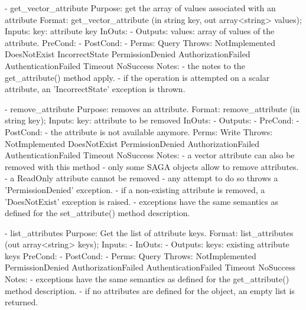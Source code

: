 \begin{myspec}
 
    - get_vector_attribute
      Purpose:  get the array of values associated with an
                attribute
      Format:   get_vector_attribute (in string           key,
                                      out array<string>   values);
      Inputs:   key:                  attribute key
      InOuts:   -
      Outputs:  values:               array of values of the
                                      attribute.
      PreCond:  -
      PostCond: -
      Perms:    Query
      Throws:   NotImplemented
                DoesNotExist
                IncorrectState
                PermissionDenied
                AuthorizationFailed
                AuthenticationFailed
                Timeout
                NoSuccess
      Notes:    - the notes to the get_attribute() method apply.
                - if the operation is attempted on a scalar
                  attribute, an 'IncorrectState' exception is
                  thrown.
 
 
    - remove_attribute
      Purpose:  removes an attribute.
      Format:   remove_attribute     (in string key);
      Inputs:   key:                  attribute to be removed
      InOuts:   -
      Outputs:  -
      PreCond:  -
      PostCond: - the attribute is not available anymore.
      Perms:    Write
      Throws:   NotImplemented
                DoesNotExist
                PermissionDenied
                AuthorizationFailed
                AuthenticationFailed
                Timeout
                NoSuccess
      Notes:    - a vector attribute can also be removed with
                  this method
                - only some SAGA objects allow to remove
                  attributes.
                - a ReadOnly attribute cannot be removed - any
                  attempt to do so throws a 'PermissionDenied' 
                  exception.
                - if a non-existing attribute is removed, a
                  'DoesNotExist' exception is raised.
                - exceptions have the same semantics as defined
                  for the set_attribute() method description.
 
 
    - list_attributes
      Purpose:  Get the list of attribute keys.
      Format:   list_attributes      (out array<string>   keys);
      Inputs:   -
      InOuts:   -
      Outputs:  keys:                 existing attribute keys
      PreCond:  -
      PostCond: -
      Perms:    Query
      Throws:   NotImplemented
                PermissionDenied
                AuthorizationFailed
                AuthenticationFailed
                Timeout
                NoSuccess
      Notes:    - exceptions have the same semantics as defined
                  for the get_attribute() method description.
                - if no attributes are defined for the object, 
                  an empty list is returned.
 

\end{myspec}
